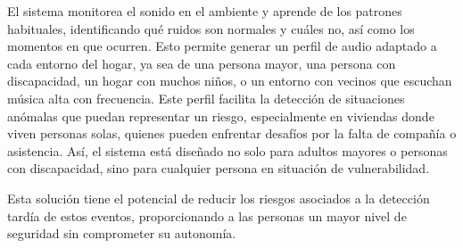 El sistema monitorea el sonido en el ambiente y aprende de los patrones habituales, identificando qué ruidos son normales y cuáles no, así como los momentos en que ocurren. Esto permite generar un perfil de audio adaptado a cada entorno del hogar, ya sea de una persona mayor, una persona con discapacidad, un hogar con muchos niños, o un entorno con vecinos que escuchan música alta con frecuencia. Este perfil facilita la detección de situaciones anómalas que puedan representar un riesgo, especialmente en viviendas donde viven personas solas, quienes pueden enfrentar desafíos por la falta de compañía o asistencia. Así, el sistema está diseñado no solo para adultos mayores o personas con discapacidad, sino para cualquier persona en situación de vulnerabilidad.

Esta solución tiene el potencial de reducir los riesgos asociados a la detección tardía de estos eventos, proporcionando a las personas un mayor nivel de seguridad sin comprometer su autonomía.

